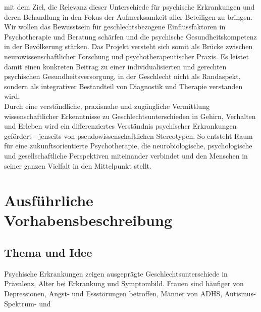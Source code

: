\documentclass[11pt,a4paper]{article}
\begin{document}
mit dem Ziel, die Relevanz dieser Unterschiede für psychische Erkrankungen und deren Behandlung in den Fokus der 
Aufmerksamkeit aller Beteiligen zu bringen.\\
Wir wollen das Bewusstsein für geschlechtsbezogene Einflussfaktoren in Psychotherapie und Beratung 
schärfen und die psychische Gesundheitskompetenz in der Bevölkerung stärken. Das Projekt versteht sich somit als Brücke zwischen 
neurowissenschaftlicher Forschung und psychotherapeutischer Praxis. Es leistet damit einen konkreten Beitrag zu einer 
individualisierten und gerechten psychischen Gesundheitsversorgung, in der Geschlecht nicht als Randaspekt, 
sondern als integrativer Bestandteil von Diagnostik und Therapie verstanden wird.\\
Durch eine verständliche, praxisnahe und zugängliche Vermittlung wissenschaftlicher Erkenntnisse 
zu Geschlechtsunterschieden in Gehirn, Verhalten und Erleben wird ein differenziertes Verständnis 
psychischer Erkrankungen gefördert - jenseits von pseudowissenschaftlichen Stereotypen.
So entsteht Raum für eine zukunftsorientierte Psychotherapie, die neurobiologische, psychologische und 
gesellschaftliche Perspektiven miteinander verbindet und den Menschen in seiner ganzen Vielfalt in den 
Mittelpunkt stellt.

\section*{Ausführliche Vorhabensbeschreibung}

\subsection*{Thema und Idee}

Psychische Erkrankungen zeigen ausgeprägte Geschlechtsunterschiede in Prävalenz, Alter bei Erkrankung und Symptombild. 
Frauen sind häufiger von Depressionen, Angst- und Essstörungen betroffen, Männer von ADHS, Autismus-Spektrum- und 
\end{document}
